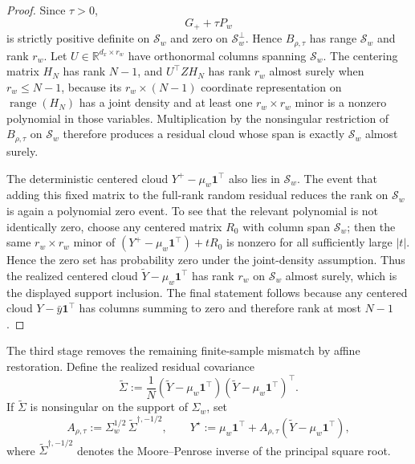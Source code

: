 \begin{proof}
Since \(\tau>0\),
\[
  G_+ + \tau P_w
\]
is strictly positive definite on \(\mathcal S_w\) and zero on
\(\mathcal S_w^\perp\).  Hence \(B_{\rho,\tau}\) has range \(\mathcal S_w\) and
rank \(r_w\).  Let \(U\in\mathbb R^{d_x\times r_w}\) have orthonormal columns
spanning \(\mathcal S_w\).  The centering matrix \(H_N\) has rank \(N-1\), and
\(U^\top ZH_N\) has rank \(r_w\) almost surely when \(r_w\le N-1\), because its
\(r_w\times (N-1)\) coordinate representation on
\(\operatorname{range}(H_N)\) has a joint density and at least one
\(r_w\times r_w\) minor is a nonzero polynomial in those variables.
Multiplication by the nonsingular
restriction of \(B_{\rho,\tau}\) on \(\mathcal S_w\) therefore produces a
residual cloud whose span is exactly \(\mathcal S_w\) almost surely.

The deterministic centered cloud \(Y^+-\mu_w\mathbf 1^\top\) also lies in
\(\mathcal S_w\).  The event that adding this fixed matrix to the full-rank
random residual reduces the rank on \(\mathcal S_w\) is again a polynomial zero
event.  To see that the relevant polynomial is not identically zero, choose any
centered matrix \(R_0\) with column span \(\mathcal S_w\); then the same
\(r_w\times r_w\) minor of
\((Y^+-\mu_w\mathbf 1^\top)+tR_0\) is nonzero for all sufficiently large
\(|t|\).  Hence the zero set has probability zero under the joint-density
assumption.  Thus the realized centered cloud
\(\widetilde Y-\mu_w\mathbf 1^\top\) has rank \(r_w\) on \(\mathcal S_w\) almost
surely, which is the displayed support inclusion.  The final statement follows
because any centered cloud \(Y-\bar y\mathbf 1^\top\) has columns summing to zero
and therefore rank at most \(N-1\).
\end{proof}

The third stage removes the remaining finite-sample mismatch by affine
restoration.  Define the realized residual covariance
\[
  \widetilde\Sigma
  :=
  \frac1N
  (\widetilde Y-\mu_w\mathbf 1^\top)
  (\widetilde Y-\mu_w\mathbf 1^\top)^\top .
\]
If \(\widetilde\Sigma\) is nonsingular on the support of \(\Sigma_w\), set
\begin{equation}
\label{eq:bf-eot-residual-affine-map}
  A_{\rho,\tau}
  :=
  \Sigma_w^{1/2}\,\widetilde\Sigma^{\dagger,-1/2},
  \qquad
  Y^\star
  :=
  \mu_w\mathbf 1^\top
  +
  A_{\rho,\tau}
  (\widetilde Y-\mu_w\mathbf 1^\top),
\end{equation}
where \(\widetilde\Sigma^{\dagger,-1/2}\) denotes the Moore--Penrose inverse of
the principal square root.

